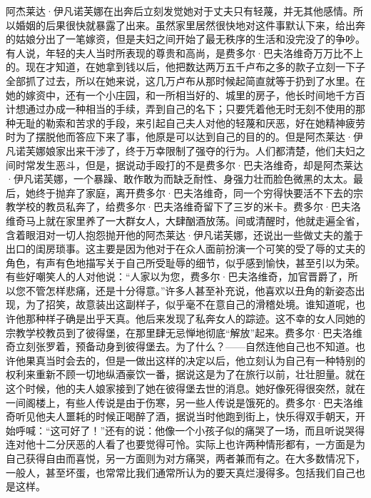 \par 阿杰莱达·伊凡诺芙娜在出奔后立刻发觉她对于丈夫只有轻蔑，并无其他感情。所以婚姻的后果很快就暴露了出来。虽然家里居然很快地对这件事默认下来，给出奔的姑娘分出了一笔嫁资，但是夫妇之间开始了最无秩序的生活和没完没了的争吵。有人说，年轻的夫人当时所表现的尊贵和高尚，是费多尔·巴夫洛维奇万万比不上的。现在才知道，在她拿到钱以后，他把数达两万五千卢布之多的款子立刻一下子全部抓了过去，所以在她来说，这几万卢布从那时候起简直就等于扔到了水里。在她的嫁资中，还有一个小庄园，和一所相当好的、城里的房子，他长时间地千方百计想通过办成一种相当的手续，弄到自己的名下；只要凭着他无时无刻不使用的那种无耻的勒索和苦求的手段，来引起自己夫人对他的轻蔑和厌恶，好在她精神疲劳时为了摆脱他而答应下来了事，他原是可以达到自己的目的的。但是阿杰莱达·伊凡诺芙娜娘家出来干涉了，终于万幸限制了强夺的行为。人们都清楚，他们夫妇之间时常发生恶斗，但是，据说动手殴打的不是费多尔·巴夫洛维奇，却是阿杰莱达·伊凡诺芙娜，一个暴躁、敢作敢为而缺乏耐性、身强力壮而脸色微黑的太太。最后，她终于抛弃了家庭，离开费多尔·巴夫洛维奇，同一个穷得快要活不下去的宗教学校的教员私奔了，给费多尔·巴夫洛维奇留下了三岁的米卡。费多尔·巴夫洛维奇马上就在家里养了一大群女人，大肆酗酒放荡。间或清醒时，他就走遍全省，含着眼泪对一切人抱怨抛开他的阿杰莱达·伊凡诺芙娜，还说出一些做丈夫的羞于出口的闺房琐事。这主要是因为他对于在众人面前扮演一个可笑的受了辱的丈夫的角色，有声有色地描写关于自己所受耻辱的细节，似乎感到愉快，甚至引以为荣。有些好嘲笑人的人对他说：“人家以为您，费多尔·巴夫洛维奇，加官晋爵了，所以您不管怎样悲痛，还是十分得意。”许多人甚至补充说，他喜欢以丑角的新姿态出现，为了招笑，故意装出这副样子，似乎毫不在意自己的滑稽处境。谁知道呢，也许他那种样子确是出乎天真。他后来发现了私奔女人的踪迹。这不幸的女人同她的宗教学校教员到了彼得堡，在那里肆无忌惮地彻底“解放”起来。费多尔·巴夫洛维奇立刻张罗着，预备动身到彼得堡去。为了什么？——自然连他自己也不知道。也许他果真当时会去的，但是一做出这样的决定以后，他立刻认为自己有一种特别的权利来重新不顾一切地纵酒豪饮一番，据说这是为了在旅行以前，壮壮胆量。就在这个时候，他的夫人娘家接到了她在彼得堡去世的消息。她好像死得很突然，就在一间阁楼上，有些人传说是由于伤寒，另一些人传说是饿死的。费多尔·巴夫洛维奇听见他夫人噩耗的时候正喝醉了酒，据说当时他跑到街上，快乐得双手朝天，开始呼喊：“这可好了！”还有的说：他像一个小孩子似的痛哭了一场，而且听说哭得连对他十二分厌恶的人看了也要觉得可怜。实际上也许两种情形都有，一方面是为自己获得自由而喜悦，另一方面则为对方痛哭，两者兼而有之。在大多数情况下，一般人，甚至坏蛋，也常常比我们通常所认为的要天真烂漫得多。包括我们自己也是这样。
